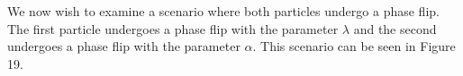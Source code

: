 \documentclass[twocolumn]{article}
\begin{document}
We now wish to examine a scenario where both particles undergo a phase flip. The first particle undergoes a phase flip with the parameter $\lambda$ and the second undergoes a phase flip with the parameter $\alpha$. This scenario can be seen in Figure 19.
\begin{figure}[ht]
    \centering
\end{figure}
\end{document}
